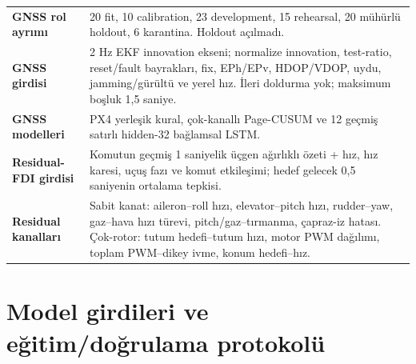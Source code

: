 \documentclass[10pt,a4paper]{article}
\begin{document}
\begin{tabularx}{\textwidth}{>{\bfseries}p{}X}
GNSS rol ayrımı & 20 fit, 10 calibration, 23 development, 15 rehearsal,
20 mühürlü holdout, 6 karantina. Holdout açılmadı. \\
GNSS girdisi & 2 Hz EKF innovation ekseni; normalize innovation, test-ratio,
reset/fault bayrakları, fix, EPh/EPv, HDOP/VDOP, uydu, jamming/gürültü ve yerel hız.
İleri doldurma yok; maksimum boşluk 1,5 saniye. \\
GNSS modelleri & PX4 yerleşik kural, çok-kanallı Page-CUSUM ve 12 geçmiş satırlı
hidden-32 bağlamsal LSTM. \\
Residual-FDI girdisi & Komutun geçmiş 1 saniyelik üçgen ağırlıklı özeti + hız,
hız karesi, uçuş fazı ve komut etkileşimi; hedef gelecek 0,5 saniyenin ortalama tepkisi. \\
Residual kanalları & Sabit kanat: aileron--roll hızı, elevator--pitch hızı,
rudder--yaw, gaz--hava hızı türevi, pitch/gaz--tırmanma, çapraz-iz hatası.
Çok-rotor: tutum hedefi--tutum hızı, motor PWM dağılımı, toplam PWM--dikey ivme,
konum hedefi--hız. \\
\end{tabularx}

\section{Model girdileri ve eğitim/doğrulama protokolü}
\end{document}

